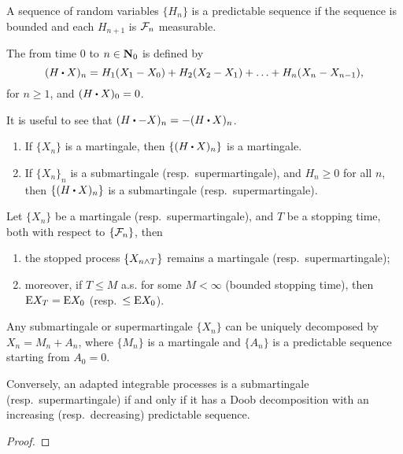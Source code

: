 \begin{defn}
    A sequence of random variables $\{H_n\}$ is a predictable sequence if the sequence is bounded and each $H_{n+1}$ is $\mathcal{F}_n$ measurable.
\end{defn}

The  from time $0$ to $n\in \mathbf{N}_0$ is defined by \[
    (H \sbullet X)_{n} = H_1(X_1 - X_0) + H_2(X_2 - X_1) + \dotsc + H_n(X_n - X_{n-1}),
\] for $n \geq 1$, and $(H \sbullet X)_{0} = 0$.

It is useful to see that $(H\sbullet -X)_n = -(H \sbullet X)_n$.

\begin{prop} \leavevmode
\begin{enumerate} 
    \item If $\{X_n\}$ is a martingale, then $\{(H \sbullet X)_n\}$ is a martingale.
    \item If $\{X_n\}_n$ is a submartingale (resp.\ supermartingale), and $H_n \geq 0$ for all $n$, then $\{(H \sbullet X)_n\}$ is a submartingale (resp.\ supermartingale).
\end{enumerate}
\end{prop}

\begin{namedthm} \label{thm:OST-1}
Let $\{X_n\}$ be a martingale (resp.\ supermartingale), and $T$ be a stopping time, both with respect to $\{\mathcal{F}_n\}$, then 
    \begin{enumerate}
        \item the stopped process $\{X_{n \land T}\}$ remains a martingale (resp.\ supermartingale);
        \item moreover, if $T \leq M$ a.s. for some $M < \infty$ (bounded stopping time), then $\mathop{}\!\mathrm{E} X_T = \mathop{}\!\mathrm{E} X_0$ (resp.\ $\leq \mathop{}\!\mathrm{E} X_0$).
    \end{enumerate}
\end{namedthm}

\begin{namedthm}
    Any submartingale or supermartingale  $\{X_n\}$ can be uniquely decomposed by $X_n = M_n + A_n$, where $\{M_n\}$ is a martingale and $\{A_n\}$ is a predictable sequence starting from $A_0 = 0$.

    Conversely, an adapted integrable processes is a submartingale (resp.\ supermartingale) if and only if it has a Doob decomposition with an increasing (resp.\ decreasing) predictable sequence.
\end{namedthm}
\begin{proof}
    
\end{proof}

